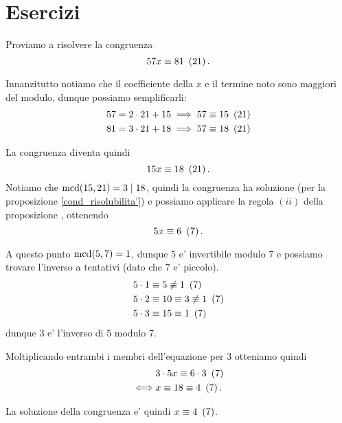 \section{Esercizi}

\begin{example}
    Proviamo a risolvere la congruenza \[
        57x \equiv 81 \ \left( 21\right).
    \]

    Innanzitutto notiamo che il coefficiente della $x$ e il termine noto sono maggiori del modulo, dunque possiamo semplificarli: \begin{align*}
        &57 = 2\cdot 21 + 15 \implies 57 \equiv 15 \ \left( 21\right)\\
        &81 = 3\cdot 21 + 18 \implies 57 \equiv 18 \ \left( 21\right)
    \end{align*}

    La congruenza diventa quindi \[
        15x \equiv 18 \ \left( 21\right).    
    \]
    Notiamo che $\operatorname{mcd}\!\left(15, 21\right) = 3 \mid 18$, quindi la congruenza ha soluzione (per la proposizione \ref{cond_risolubilita'}) e possiamo applicare la regola $(ii)$ della proposizione \label{risoluzione_congr_lineare}, ottenendo \[
        5x \equiv 6 \ \left(7\right).    
    \]

    A questo punto $\operatorname{mcd}\!\left(5, 7\right) = 1$, dunque $5$ e' invertibile modulo $7$ e possiamo trovare l'inverso a tentativi (dato che $7$ e' piccolo).
    \begin{align*}
        &5 \cdot 1 \equiv 5 \not\equiv 1 \ \left(7\right)\\
        &5 \cdot 2 \equiv 10 \equiv 3 \not\equiv 1 \ \left(7\right)\\
        &5 \cdot 3 \equiv 15 \equiv 1 \ \left(7\right)
    \end{align*}
    dunque $3$ e' l'inverso di $5$ modulo $7$. 
    
    Moltiplicando entrambi i membri dell'equazione per $3$ otteniamo quindi \begin{align*}
        &3 \cdot 5x \equiv 6 \cdot 3 \ \left(7\right)\\
        \iff & x \equiv 18 \equiv 4 \ \left(7\right).
    \end{align*}

    La soluzione della congruenza e' quindi $x \equiv 4 \ \left(7\right)$.
\end{example}